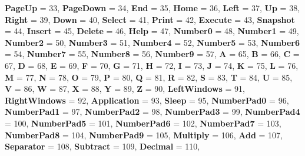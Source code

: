 \begin{DoxyCompactItemize}
{\bfseries Page\+Up} = 33, 
{\bfseries Page\+Down} = 34, 
{\bfseries End} = 35, 
{\bfseries Home} = 36, 
\newline
{\bfseries Left} = 37, 
{\bfseries Up} = 38, 
{\bfseries Right} = 39, 
{\bfseries Down} = 40, 
\newline
{\bfseries Select} = 41, 
{\bfseries Print} = 42, 
{\bfseries Execute} = 43, 
{\bfseries Snapshot} = 44, 
\newline
{\bfseries Insert} = 45, 
{\bfseries Delete} = 46, 
{\bfseries Help} = 47, 
{\bfseries Number0} = 48, 
\newline
{\bfseries Number1} = 49, 
{\bfseries Number2} = 50, 
{\bfseries Number3} = 51, 
{\bfseries Number4} = 52, 
\newline
{\bfseries Number5} = 53, 
{\bfseries Number6} = 54, 
{\bfseries Number7} = 55, 
{\bfseries Number8} = 56, 
\newline
{\bfseries Number9} = 57, 
{\bfseries A} = 65, 
{\bfseries B} = 66, 
{\bfseries C} = 67, 
\newline
{\bfseries D} = 68, 
{\bfseries E} = 69, 
{\bfseries F} = 70, 
{\bfseries G} = 71, 
\newline
{\bfseries H} = 72, 
{\bfseries I} = 73, 
{\bfseries J} = 74, 
{\bfseries K} = 75, 
\newline
{\bfseries L} = 76, 
{\bfseries M} = 77, 
{\bfseries N} = 78, 
{\bfseries O} = 79, 
\newline
{\bfseries P} = 80, 
{\bfseries Q} = 81, 
{\bfseries R} = 82, 
{\bfseries S} = 83, 
\newline
{\bfseries T} = 84, 
{\bfseries U} = 85, 
{\bfseries V} = 86, 
{\bfseries W} = 87, 
\newline
{\bfseries X} = 88, 
{\bfseries Y} = 89, 
{\bfseries Z} = 90, 
{\bfseries Left\+Windows} = 91, 
\newline
{\bfseries Right\+Windows} = 92, 
{\bfseries Application} = 93, 
{\bfseries Sleep} = 95, 
{\bfseries Number\+Pad0} = 96, 
\newline
{\bfseries Number\+Pad1} = 97, 
{\bfseries Number\+Pad2} = 98, 
{\bfseries Number\+Pad3} = 99, 
{\bfseries Number\+Pad4} = 100, 
\newline
{\bfseries Number\+Pad5} = 101, 
{\bfseries Number\+Pad6} = 102, 
{\bfseries Number\+Pad7} = 103, 
{\bfseries Number\+Pad8} = 104, 
\newline
{\bfseries Number\+Pad9} = 105, 
{\bfseries Multiply} = 106, 
{\bfseries Add} = 107, 
{\bfseries Separator} = 108, 
\newline
{\bfseries Subtract} = 109, 
{\bfseries Decimal} = 110, 

\end{DoxyCompactItemize}
